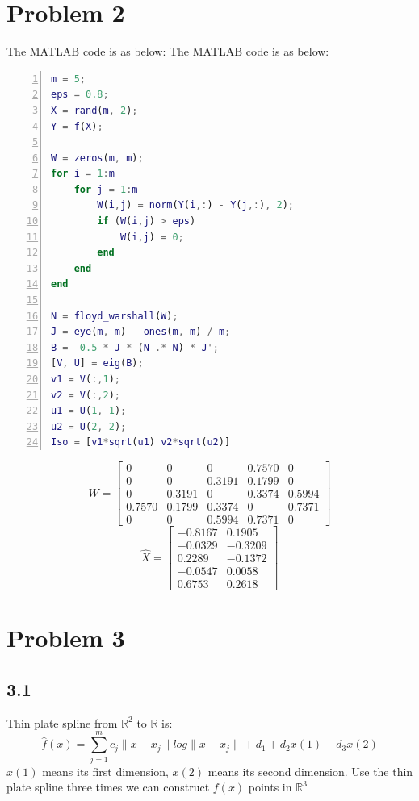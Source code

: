 \documentclass[a4paper, 11pt]{article}
\begin{document}
\section*{Problem 2}
The MATLAB code is as below:
The MATLAB code is as below:
\begin{lstlisting}[language = Matlab, numbers=left,   
  numberstyle=\tiny,keywordstyle=\color{blue!70},  
  commentstyle=\color{red!50!green!50!blue!50},frame=shadowbox,  
  rulesepcolor=\color{red!20!green!20!blue!20},basicstyle=\ttfamily,
  tabsize=2]
m = 5;
eps = 0.8;
X = rand(m, 2);
Y = f(X);

W = zeros(m, m);
for i = 1:m
	for j = 1:m
		W(i,j) = norm(Y(i,:) - Y(j,:), 2);
		if (W(i,j) > eps)
			W(i,j) = 0;
		end
	end
end

N = floyd_warshall(W);
J = eye(m, m) - ones(m, m) / m;
B = -0.5 * J * (N .* N) * J';
[V, U] = eig(B);
v1 = V(:,1);
v2 = V(:,2);
u1 = U(1, 1);
u2 = U(2, 2);
Iso = [v1*sqrt(u1) v2*sqrt(u2)]  
\end{lstlisting}
$$
W =
\begin{bmatrix}
         0 &       0 &       0 &  0.7570 &       0 \\
         0 &       0 &  0.3191 &  0.1799 &       0 \\
         0 &  0.3191 &       0 &  0.3374 &  0.5994 \\
    0.7570 &  0.1799 &  0.3374 &       0 &  0.7371 \\
         0 &       0 &  0.5994 &  0.7371 &       0
\end{bmatrix}
$$
$$
\hat{X} =
\begin{bmatrix}
   -0.8167 &   0.1905 \\
   -0.0329 &  -0.3209 \\
    0.2289 &  -0.1372 \\
   -0.0547 &   0.0058 \\
    0.6753 &   0.2618
\end{bmatrix}
$$

\section*{Problem 3}
\subsection*{3.1}
Thin plate spline from $\mathbb{R}^2$ to $\mathbb{R}$ is:
$$
\hat{f}(x)=\sum_{j=1}^mc_j\|x-x_j\|log\|x-x_j\|+d_1+d_2x(1)+d_3x(2)
$$
$x(1)$ means its first dimension, $x(2)$ means its second dimension.
Use the thin plate spline three times we can construct $f(x)$ points in $\mathbb{R}^3$
\end{document}
